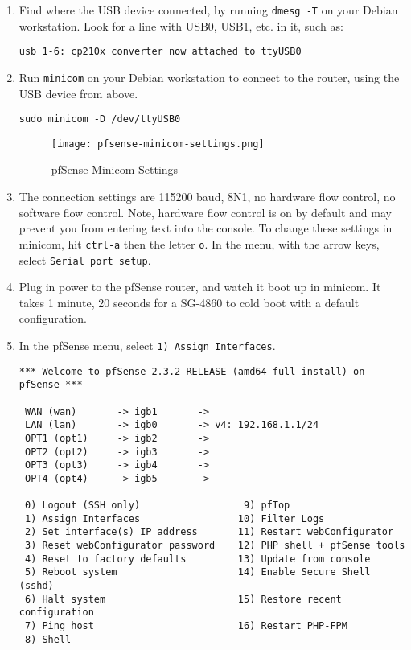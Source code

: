 \begin{enumerate}
 \item Find where the USB device connected, by running \texttt{dmesg -T} on your Debian workstation.
Look for a line with USB0, USB1, etc. in it, such as:
\begin{verbatim}
usb 1-6: cp210x converter now attached to ttyUSB0
\end{verbatim}
 \item Run \texttt{minicom} on your Debian workstation to connect to the router, using the USB device from above.
\begin{verbatim}
sudo minicom -D /dev/ttyUSB0
\end{verbatim}

\begin{figure}[h!]
\begin{center}
\texttt{[image: pfsense-minicom-settings.png]}
 \caption{pfSense Minicom Settings}
 \label{fig:pfsense-minicom-settings}
\end{center}
\end{figure}
 \item The connection settings are 115200 baud, 8N1, no hardware flow control, no software flow control. Note, hardware flow control is on by default and may prevent you from entering text into the console. To change these settings in minicom, hit \texttt{ctrl-a} then the letter \texttt{o}. In the menu, with the arrow keys, select \texttt{Serial port setup}.
 \item Plug in power to the pfSense router, and watch it boot up in minicom. It takes 1 minute, 20 seconds for a SG-4860 to cold boot with a default configuration.
 \item In the pfSense menu, select \texttt{1) Assign Interfaces}.
\begin{verbatim}
*** Welcome to pfSense 2.3.2-RELEASE (amd64 full-install) on pfSense ***

 WAN (wan)       -> igb1       -> 
 LAN (lan)       -> igb0       -> v4: 192.168.1.1/24
 OPT1 (opt1)     -> igb2       -> 
 OPT2 (opt2)     -> igb3       -> 
 OPT3 (opt3)     -> igb4       -> 
 OPT4 (opt4)     -> igb5       -> 

 0) Logout (SSH only)                  9) pfTop
 1) Assign Interfaces                 10) Filter Logs
 2) Set interface(s) IP address       11) Restart webConfigurator
 3) Reset webConfigurator password    12) PHP shell + pfSense tools
 4) Reset to factory defaults         13) Update from console
 5) Reboot system                     14) Enable Secure Shell (sshd)
 6) Halt system                       15) Restore recent configuration
 7) Ping host                         16) Restart PHP-FPM
 8) Shell
  

\end{verbatim}
\end{enumerate}
